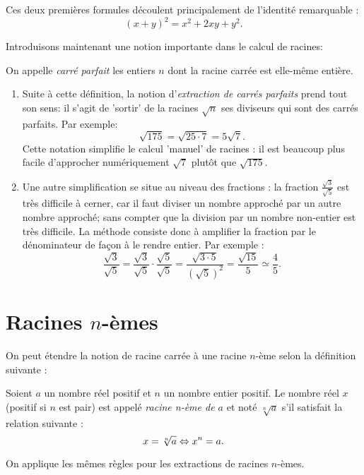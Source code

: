 Ces deux premières formules découlent principalement de l'identité remarquable :
$$
(x+y)^2 = x^2 + 2xy + y^2.
$$


Introduisons maintenant une notion importante dans le calcul de racines:

\begin{definition}
On appelle \emph{carré parfait} les entiers $n$ dont la racine carrée est elle-même entière.
\end{definition}

\begin{enumerate}
\item Suite à cette définition, la notion d'\emph{extraction de carrés parfaits} prend tout son sens: il s'agit de 'sortir' de la racines $\sqrt{n}$ ses diviseurs qui sont des carrés parfaits. Par exemple:
$$
\sqrt{175} = \sqrt{25 \cdot 7} = 5\sqrt{7}.
$$
Cette notation simplifie le calcul 'manuel' de racines : il est beaucoup plus facile d'approcher numériquement $\sqrt{7}$ plutôt que $\sqrt{175}$.
\item Une autre simplification se situe au niveau des fractions : la fraction $\frac{\sqrt{3}}{\sqrt{5}}$ est très difficile à cerner, car il faut diviser un nombre approché par un autre nombre approché; sans compter que la division par un nombre non-entier est très difficile. La méthode consiste donc à amplifier la fraction par le dénominateur de façon à le rendre entier. Par exemple :
$$
\frac{\sqrt{3}}{\sqrt{5}} = \frac{\sqrt{3}}{\sqrt{5}} \cdot \frac{\sqrt{5}}{\sqrt{5}} = \frac{\sqrt{3 \cdot 5}}{(\sqrt{5})^2} = \frac{\sqrt{15}}{5} \simeq \frac{4}{5}.
$$
\end{enumerate}


\section{Racines $n$-èmes}

On peut étendre la notion de racine carrée à une racine $n$-ème selon la définition suivante :

\begin{definition}
Soient $a$ un nombre réel positif et $n$ un nombre entier positif. Le nombre réel $x$ (positif si $n$ est pair) est appelé \emph{racine n-ème de $a$} et noté $\sqrt[n]{a}$ s'il satisfait la relation suivante :
$$
x = \sqrt[n]{a} \Leftrightarrow x^n = a.
$$
\end{definition}

On applique les mêmes règles pour les extractions de racines $n$-èmes.

